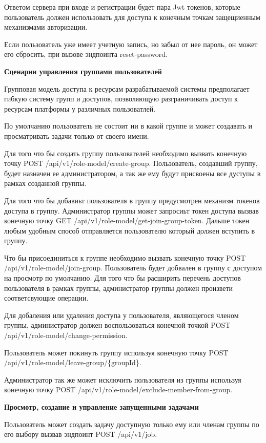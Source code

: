 Ответом сервера при входе и регистрации будет пара Jwt токенов\cite{ahmed2019authentication}, которые пользователь должен использовать для доступа к конечным точкам защещиенным механизмами авторизации.

Если пользователь уже имеет учетную запись, но забыл от нее пароль, он может его сбросить, при вызове эндпоинта reset-password.

{\bf Сценарии управления группами пользователей }

Групповая модель доступа к ресурсам разрабатываемой системы предполагает гибкую систему групп и доступов, позволяющую разграничивать доступ к ресурсам платформы у различных пользоватлей.

По умолчанию пользователь не состоит ни в какой группе и может создавать и просматривать задачи только от своего имени.

Для того что бы создать группу пользователей необходимо вызвать конечную точку POST /api/v1/role-model/create-group. Пользователь, создавший группу, будет назначен ее администратором, а так же ему будут присвоены все дуступы в рамках созданной группы.

Для того что бы добавиьт пользователя в группу предусмотрен механизм токенов доступа в группу.
Администратор группы может запросиьт токен доступа вызвав конечную точку GET /api/v1/role-model/get-join-group-token.
Дальше токен любым удобным способ отправляется пользователю который должен вступить в группу.

Что бы присоединиться к группе необходимо вызвать конечную точку POST /api/v1/role-model/join-group.
Пользователь будет добвален в группу с доступом на просмотр по умолчанию.
Для того что бы расширить перечень доступов пользователя в рамках группы, администратор группы должен произвети соответсвующие операции.

Для добаления или удаления доступа у пользователя, являющегося членом группы, администратор должен воспользоваться конечной точкой POST /api/v1/role-model/change-permission.

Пользователь может покинуть группу используя конечную точку POST /api/v1/role-model/leave-group/\{groupId\}.

Администратор так же может исключить пользователя из группы используя конечную точку POST /api/v1/role-model/exclude-member-from-group.

{\bf Просмотр, создание и управление запущенными задачами }

Пользователь может создать задачу доступную только ему или членам группы по его выбору вызвав эндпоинт POST /api/v1/job.

